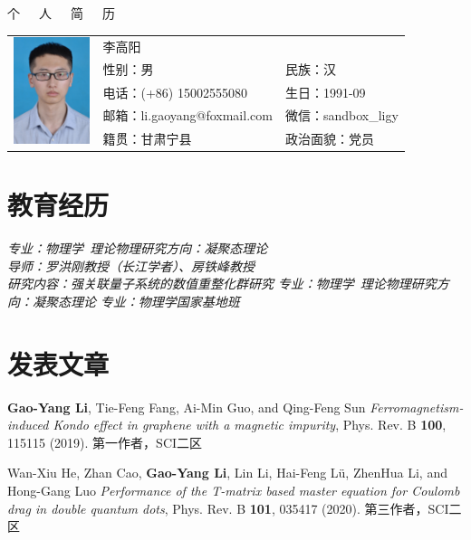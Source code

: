 \documentclass{resume}
\begin{document}

\begin{center}
\Huge{个~~~人~~~简~~~历}
\end{center}
\Large{
  \begin{tabu}{ c l l }
    &
   \scshape{李高阳} &  \\
    & 性别：男 & 民族：汉 \\
    & 电话：(+86) 15002555080 & 生日：1991-09 \\
    & 邮箱：li.gaoyang@foxmail.com & 微信：sandbox\_ligy\\
    & 籍贯：甘肃宁县 & 政治面貌：党员
  \end{tabu}
}

\section{教育经历}
\textit{专业：物理学\ 理论物理\qquad\qquad\qquad 研究方向：凝聚态理论}\\
\textit{导师：罗洪刚教授（长江学者）、房铁峰教授}\\
\textit{研究内容：强关联量子系统的数值重整化群研究}
\textit{专业：物理学\ 理论物理\qquad\qquad\qquad 研究方向：凝聚态理论}
\textit{专业：物理学国家基地班}

\section{发表文章}
\textbf{Gao-Yang Li}, Tie-Feng Fang, Ai-Min Guo, and Qing-Feng Sun \textit{Ferromagnetism-induced Kondo effect in graphene with a magnetic impurity}, Phys. Rev. B \textbf{100}, 115115 (2019). 第一作者，SCI二区
\item Wan-Xiu He, Zhan Cao, \textbf{Gao-Yang Li}, Lin Li, Hai-Feng Lü, ZhenHua Li, and Hong-Gang Luo \textit{Performance of the T-matrix based master equation for Coulomb drag in double quantum dots}, Phys. Rev. B \textbf{101}, 035417 (2020). 第三作者，SCI二区
\end{document}
